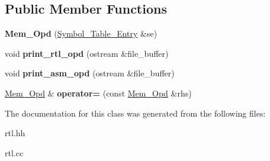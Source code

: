 \subsection*{Public Member Functions}
\begin{DoxyCompactItemize}
\item 
\mbox{\label{classMem__Opd_aa95863d9f05a550ac54dfe252e8f24b9}} 
{\bfseries Mem\+\_\+\+Opd} (\hyperlink{classSymbol__Table__Entry}{Symbol\+\_\+\+Table\+\_\+\+Entry} \&se)
\item 
\mbox{\label{classMem__Opd_a47b309bf4b5dfa9067a38f0222eea196}} 
void {\bfseries print\+\_\+rtl\+\_\+opd} (ostream \&file\+\_\+buffer)
\item 
\mbox{\label{classMem__Opd_ac1505a9c24e4538d66984a346473155c}} 
void {\bfseries print\+\_\+asm\+\_\+opd} (ostream \&file\+\_\+buffer)
\item 
\mbox{\label{classMem__Opd_a9579c9d0a10b80807a8703bc82686d9e}} 
\hyperlink{classMem__Opd}{Mem\+\_\+\+Opd} \& {\bfseries operator=} (const \hyperlink{classMem__Opd}{Mem\+\_\+\+Opd} \&rhs)
\end{DoxyCompactItemize}


The documentation for this class was generated from the following files\+:\begin{DoxyCompactItemize}
\item 
rtl.\+hh\item 
rtl.\+cc\end{DoxyCompactItemize}
